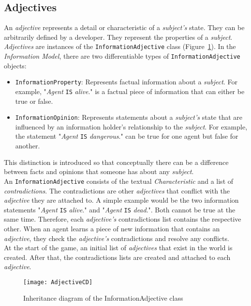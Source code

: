 \subsection{Adjectives}
An \textit{adjective} represents a detail or characteristic of a \textit{subject's} state. They can be arbitrarily defined by a developer. They represent the properties of a \textit{subject}. \textit{Adjectives} are instances of the \verb|InformationAdjective| class (Figure~\ref{fig:adjectiveCD}). In the \textit{Information Model}, there are two differentiable types of \verb|InformationAdjective| objects:
\begin{itemize}
	\item \verb|InformationProperty|: Represents factual information about a \textit{subject}. For example, "\textit{Agent} \verb|IS| \textit{alive}." is a factual piece of information that can either be true or false.
	\item \verb|InformationOpinion|: Represents statements about a \textit{subject's} state that are influenced by an information holder's relationship to the \textit{subject}. For example, the statement "\textit{Agent} \verb|IS| \textit{dangerous}." can be true for one agent but false for another.
\end{itemize}
This distinction is introduced so that conceptually there can be a difference between facts and opinions that someone has about any \textit{subject}.\\
An \verb|InformationAdjective| consists of the textual \textit{Characteristic} and a list of \textit{contradictions}. The contradictions are other \textit{adjectives} that conflict with the \textit{adjective} they are attached to. A simple example would be the two information statements  "\textit{Agent} \verb|IS| \textit{alive}." and  "\textit{Agent} \verb|IS| \textit{dead}.". Both cannot be true at the same time. Therefore, each \textit{adjective's} contradictions list contains the respective other. When an agent learns a piece of new information that contains an \textit{adjective}, they check the \textit{adjective's} contradictions and resolve any conflicts.\\
At the start of the game, an initial list of \textit{adjectives} that exist in the world is created. After that, the contradictions lists are created and attached to each \textit{adjective}.
\begin{figure}
	\centering
	\texttt{[image: AdjectiveCD]}
	\caption{Inheritance diagram of the InformationAdjective class}
	\label{fig:adjectiveCD}
\end{figure}
